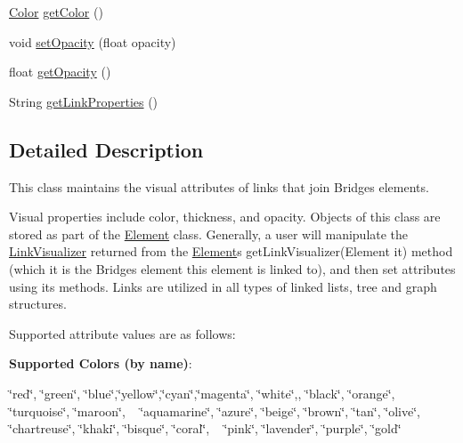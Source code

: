 \begin{DoxyCompactItemize}
\item 
\mbox{\hyperlink{classbridges_1_1base_1_1_color}{Color}} \mbox{\hyperlink{classbridges_1_1base_1_1_link_visualizer_a3ed52d98ecab99c6d8dd136fba913b7d}{get\+Color}} ()
\item 
void \mbox{\hyperlink{classbridges_1_1base_1_1_link_visualizer_ac0d59614dbc65ed0a19c25c493a1deaa}{set\+Opacity}} (float opacity)
\item 
float \mbox{\hyperlink{classbridges_1_1base_1_1_link_visualizer_a07cdd435a54e4b612ad63614f2a27a4a}{get\+Opacity}} ()
\item 
String \mbox{\hyperlink{classbridges_1_1base_1_1_link_visualizer_ab64d9b7e2b99f7ebce80cbabfe4adf2a}{get\+Link\+Properties}} ()
\end{DoxyCompactItemize}


\subsection{Detailed Description}
This class maintains the visual attributes of links that join Bridges elements. 

Visual properties include color, thickness, and opacity. Objects of this class are stored as part of the \mbox{\hyperlink{classbridges_1_1base_1_1_element}{Element}} class. Generally, a user will manipulate the \mbox{\hyperlink{classbridges_1_1base_1_1_link_visualizer}{Link\+Visualizer}} returned from the \mbox{\hyperlink{classbridges_1_1base_1_1_element}{Element}}\textquotesingle{}s get\+Link\+Visualizer(\+Element it) method (which it is the Bridges element this element is linked to), and then set attributes using its methods. Links are utilized in all types of linked lists, tree and graph structures.

Supported attribute values are as follows\+:

{\bfseries Supported Colors (by name)}\+: 

\char`\"{}red\char`\"{}, \char`\"{}green\char`\"{}, \char`\"{}blue\char`\"{},\char`\"{}yellow\char`\"{},\char`\"{}cyan\char`\"{},\char`\"{}magenta\char`\"{}, \char`\"{}white\char`\"{},, \char`\"{}black\char`\"{}, \char`\"{}orange\char`\"{}, \char`\"{}turquoise\char`\"{}, \char`\"{}maroon\char`\"{}, ~\newline
 \char`\"{}aquamarine\char`\"{}, \char`\"{}azure\char`\"{}, \char`\"{}beige\char`\"{}, \char`\"{}brown\char`\"{}, \char`\"{}tan\char`\"{}, \char`\"{}olive\char`\"{}, \char`\"{}chartreuse\char`\"{}, \char`\"{}khaki\char`\"{}, \char`\"{}bisque\char`\"{}, \char`\"{}coral\char`\"{}, ~\newline
 \char`\"{}pink\char`\"{}, \char`\"{}lavender\char`\"{}, \char`\"{}purple\char`\"{}, \char`\"{}gold\char`\"{} 

